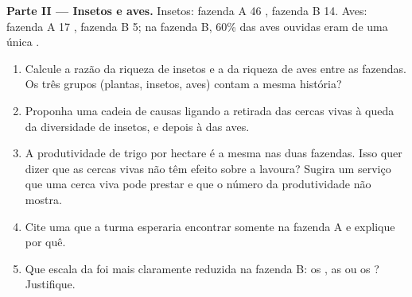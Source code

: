 \begin{problem}
\medskip
\noindent\textbf{Parte II --- Insetos e aves.}
Insetos: fazenda A 46 , fazenda B 14. Aves: fazenda A 17
, fazenda B 5; na fazenda B, 60\% das aves ouvidas eram de uma
única .
\begin{enumerate}[resume]
  \item Calcule a razão da riqueza de insetos e a da riqueza de aves
        entre as fazendas. Os três grupos (plantas, insetos, aves)
        contam a mesma história?
  \item Proponha uma cadeia de causas ligando a retirada das cercas
        vivas à queda da diversidade de insetos, e depois à das aves.
  \item A produtividade de trigo por hectare é a mesma nas duas
        fazendas. Isso quer dizer que as cercas vivas não têm efeito
        sobre a lavoura? Sugira um serviço que uma cerca viva pode
        prestar e que o número da produtividade não mostra.
  \item Cite uma  que a turma esperaria encontrar somente na
        fazenda A e explique por quê.
  \item Que escala da  foi mais claramente reduzida na
        fazenda B: os , as  ou os ? Justifique.
\end{enumerate}


\end{problem}
